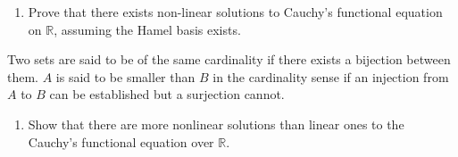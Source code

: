 \documentclass[10pt]{article}
\begin{document}
\begin{CJK*}{UTF8}{gbsn}
\begin{enumerate}
\begin{enumerate}[resume, label=\alph*.]
\item Prove that there exists non-linear solutions to Cauchy's functional equation on $\mathbb{R}$, assuming the Hamel basis exists.
\end{enumerate}

Two sets are said to be of the same cardinality if there exists a bijection between them. $A$ is said to be smaller than $B$ in the cardinality sense if an injection from $A$ to $B$ can be established but a surjection cannot.

\begin{enumerate}[resume, label=\alph*.]
\item Show that there are more nonlinear solutions than linear ones to the Cauchy's functional equation over $\mathbb{R}$.
\end{enumerate}
\end{enumerate}

\end{CJK*}
\end{document}
